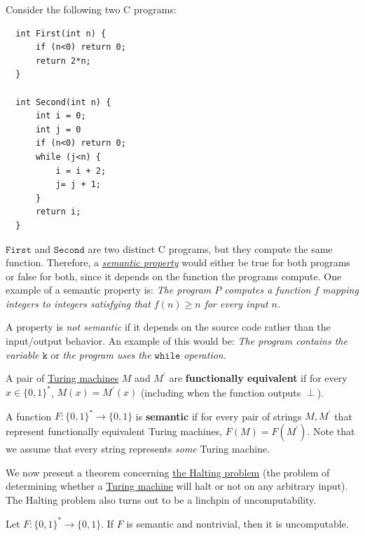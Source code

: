   \begin{example}
    \label{ex:two-programs-computing-the-same-function}
  Consider the following two C programs: 
  \begin{lstlisting}
  int First(int n) {
      if (n<0) return 0; 
      return 2*n;
  }

  int Second(int n) {
      int i = 0;
      int j = 0
      if (n<0) return 0; 
      while (j<n) {
          i = i + 2;
          j= j + 1; 
      }
      return i; 
  }
  \end{lstlisting}
  $\texttt{First}$ and $\texttt{Second}$ are two distinct C programs, but they compute the same function. Therefore, a \textit{\hyperref[def:semantic-property]{semantic property}} would either be true for both programs or false for both, since it depends on the function the programs compute. One example of a semantic property is: \textit{The program $P$ computes a function $f$ mapping integers to integers satisfying that $f(n) \geq n$ for every input $n$.} 

  A property is \textit{not semantic} if it depends on the source code rather than the input/output behavior. An example of this would be: \textit{The program contains the variable $\texttt{k}$} or \textit{the program uses the $\texttt{while}$ operation}. 
  \end{example}

  \begin{definition}
    \label{def:semantic-properties}
  A pair of \hyperref[def:turing-machine]{Turing machines} $M$ and $M^\prime$ are \textbf{functionally equivalent} if for every $x \in \{0,1\}^*$, $M(x) = M^\prime (x)$ (including when the function outputs $\perp$). 

  A function $F: \{0,1\}^* \to \{0,1\}$ is \textbf{semantic} if for every pair of strings $M, M^\prime$ that represent functionally equivalent Turing machines, $F(M) = F(M^\prime)$. Note that we assume that every string represents \textit{some} Turing machine. 
  \end{definition}

  We now present a theorem concerning \hyperref[def:the-halting-problem]{the Halting problem} (the problem of determining whether a \hyperref[def:turing-machine]{Turing machine} will halt or not on any arbitrary input). The Halting problem also turns out to be a linchpin of uncomputability. 

  \begin{theorem}
    \label{thm:rices-theorem}
  Let $F: \{0,1\}^* \to \{0,1\}$. If $F$ is semantic and nontrivial, then it is uncomputable. 
  \end{theorem}

